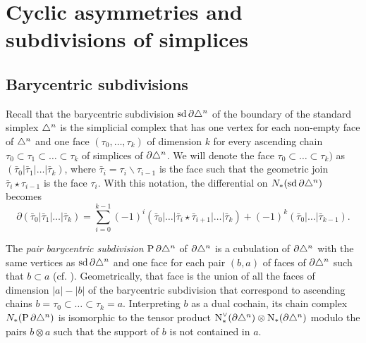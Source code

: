 
\section{Cyclic asymmetries and subdivisions of simplices}\label{section:atlast}

\subsection{Barycentric subdivisions}\label{s:assembly} Recall that the barycentric subdivision $\operatorname{sd} \partial\triangle^n$ of the boundary of the standard simplex $\triangle^n$ is the simplicial complex that has one vertex for each non-empty face of $\triangle^n$ and one face $(\tau_0,\ldots,\tau_k)$ of dimension $k$ for every ascending chain $\tau_0\subset \tau_1\subset\ldots \subset \tau_k$ of simplices of $\partial \triangle^n$. We will denote the face $\tau_0\subset \ldots\subset \tau_k)$ as $(\bar{\tau}_0|\bar{\tau}_1|\ldots|\bar{\tau}_k)$, where $\bar{\tau}_i = \tau_i\smallsetminus \tau_{i-1}$ is the face such that the geometric join $\bar{\tau}_i\star \tau_{i-1}$ is the face $\tau_i$. With this notation, the differential on $N_{*}(\operatorname{sd} \partial \triangle^n)$ becomes
\[
\partial(\bar{\tau}_0|\bar{\tau}_1|\ldots|\bar{\tau}_k) = \sum_{i=0}^{k-1} (-1)^i(\bar{\tau}_0|\ldots|\bar{\tau}_i\star \bar{\tau}_{i+1}|\ldots |\bar{\tau}_k) + (-1)^k (\bar{\tau}_0|\ldots|\bar{\tau}_{k-1}).
\]


The \emph{pair barycentric subdivision} $\operatorname{P} \partial\triangle^n$ of $\partial \triangle^n$ is a cubulation of $\partial \triangle^n$ with the same vertices as $\operatorname{sd} \partial \triangle^n$ and one face for each pair $(b,a)$ of faces of $\partial\triangle^n$ such that $b\subset a$ (cf. \cite{Rounds2010}). Geometrically, that face is the union of all the faces of dimension $|a|-|b|$ of the barycentric subdivision that correspond to ascending chains $b = \tau_0\subset \ldots\subset \tau_k= a$. Interpreting $b$ as a dual cochain, its chain complex $N_{*}(\operatorname{P} \partial\triangle^n)$ is isomorphic to the tensor product $\operatorname{N}^\vee_{*}(\partial\triangle^n)\otimes \operatorname{N}_{*}(\partial\triangle^n)$ modulo the pairs $b\otimes a$ such that the support of $b$ is not contained in $a$. 

